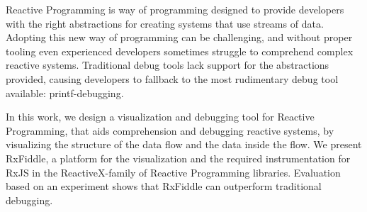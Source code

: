 Reactive Programming is way of programming designed to provide developers with the right abstractions for creating systems that use streams of data.
Adopting this new way of programming can be challenging, and without proper tooling even experienced developers sometimes struggle to comprehend complex reactive systems.
Traditional debug tools lack support for the abstractions provided, causing developers to fallback to the most rudimentary debug tool available: printf-debugging.

In this work, we design a visualization and debugging tool for Reactive Programming, that aids comprehension and debugging reactive systems, by visualizing the structure of the data flow and the data inside the flow.
We present RxFiddle, a platform for the visualization and the required instrumentation for RxJS in the ReactiveX-family of Reactive Programming libraries.
Evaluation based on an experiment shows that RxFiddle can outperform traditional debugging.
